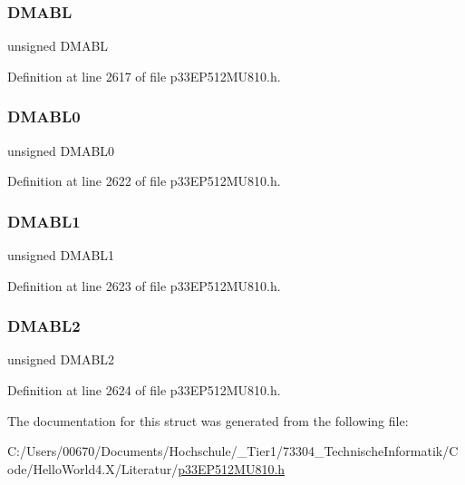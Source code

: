 \subsubsection{\texorpdfstring{D\+M\+A\+BL}{DMABL}}
{\footnotesize\ttfamily unsigned D\+M\+A\+BL}



Definition at line 2617 of file p33\+E\+P512\+M\+U810.\+h.

\mbox{\label{structtag_a_d1_c_o_n4_b_i_t_s_acda72d244c5eeafabf18f267851b89a1}} 
\subsubsection{\texorpdfstring{D\+M\+A\+B\+L0}{DMABL0}}
{\footnotesize\ttfamily unsigned D\+M\+A\+B\+L0}



Definition at line 2622 of file p33\+E\+P512\+M\+U810.\+h.

\mbox{\label{structtag_a_d1_c_o_n4_b_i_t_s_ae313e43c24c80a35a2ec07db385edf09}} 
\subsubsection{\texorpdfstring{D\+M\+A\+B\+L1}{DMABL1}}
{\footnotesize\ttfamily unsigned D\+M\+A\+B\+L1}



Definition at line 2623 of file p33\+E\+P512\+M\+U810.\+h.

\mbox{\label{structtag_a_d1_c_o_n4_b_i_t_s_ab3ae1ef64c4b8d25608d31a00b64f93d}} 
\subsubsection{\texorpdfstring{D\+M\+A\+B\+L2}{DMABL2}}
{\footnotesize\ttfamily unsigned D\+M\+A\+B\+L2}



Definition at line 2624 of file p33\+E\+P512\+M\+U810.\+h.



The documentation for this struct was generated from the following file\+:\begin{DoxyCompactItemize}
\item 
C\+:/\+Users/00670/\+Documents/\+Hochschule/\+\_\+\+Tier1/73304\+\_\+\+Technische\+Informatik/\+Code/\+Hello\+World4.\+X/\+Literatur/\hyperlink{p33_e_p512_m_u810_8h}{p33\+E\+P512\+M\+U810.\+h}\end{DoxyCompactItemize}
